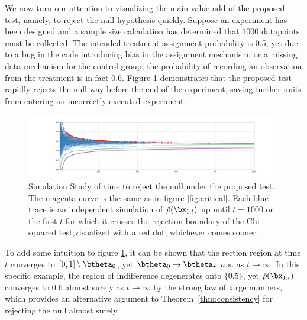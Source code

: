\documentclass[11pt]{article}
\begin{document}
  We now turn our attention to visualizing the main value add of the proposed test, namely, to reject the null hypothesis quickly.
Suppose an experiment has been designed and a sample size calculation has determined that $1000$ datapoints must be collected.
The intended treatment assignment probability is 0.5, yet due to a bug in the code introducing bias in the assignment mechanism, or a missing data mechanism for the control group, the probability of recording an observation from the treatment is in fact 0.6.
  Figure \ref{fig:ssrm_reject} demonstrates that the proposed test rapidly rejects the null way before the end of the experiment, saving further units from entering an incorrectly executed experiment.
      \begin{figure}[H]
  \centering
  \includegraphics[scale=0.35]{images/ssrm_reject.png}
  \caption{Simulation Study of time to reject the null under the proposed test.
The magenta curve is the same as in figure \ref{fig:critical}.
Each blue trace is an independent simulation of $\hat{\rho}(\bx_{1:t})$ up until $t=1000$ or the first $t$ for which it crosses the rejection boundary of the Chi-squared test,visualized with a red dot, whichever comes sooner.
}
    \label{fig:ssrm_reject}
  \end{figure}
  \noindent To add some intuition to figure \ref{fig:ssrm_reject}, it can be shown that the rection region at time $t$ converges to $[0,1]\setminus \btheta_0$, yet $\btheta_0 \rightarrow \btheta_\star$ $a.s.$ as $t\rightarrow \infty$.
In this specific example, the region of indifference degenerates onto $\lbrace 0.5 \rbrace$, yet $\hat{\rho}(\bx_{1:t})$ converges to 0.6 almost surely as $t \rightarrow \infty$ by the strong law of large numbers, which provides an alternative argument to Theorem~\ref{thm:consistency} for rejecting the null almost surely.
\end{document}

